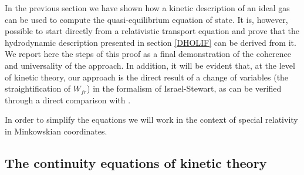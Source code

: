 \documentclass[useAMS,usenatbib,prd,twocolumn,nofootinbib]{revtex4-1}
\begin{document}
In the previous section we have shown how a kinetic description of an ideal gas can be used to compute the quasi-equilibrium equation of state. It is, however, possible to start directly from a relativistic transport equation and prove that the hydrodynamic description presented in section \ref{DHOLIF} can be derived from it. We report here the steps of this proof as a final demonstration of the coherence and universality of the approach. In addition, it will be evident that, at the level of kinetic theory, our approach is the direct result of a change of variables (the straightification of $W_{fr}$) in the formalism of Israel-Stewart, as can be verified through a direct comparison with \cite{Israel_Stewart_1979}. 

In order to simplify the equations we will work in the context of special relativity in Minkowskian coordinates.


\subsection{The continuity equations of kinetic theory} 
\end{document}
